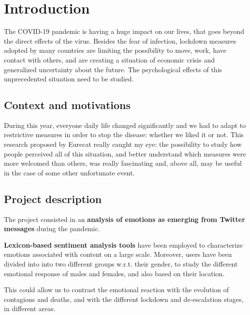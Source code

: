 \chapter{Introduction}
\label{cha:intro}

The COVID-19 pandemic is having a huge impact on our lives, that goes beyond the direct effects of the virus. Besides the fear of infection, lockdown measures adopted by many countries are limiting the possibility to move, work, have contact with others, and are creating a situation of economic crisis and generalized uncertainty about the future. The psychological effects of this unprecedented situation need to be studied.


\section{Context and motivations}
\label{sec:context}

During this year, everyone daily life changed significantly and we had to adapt to restrictive measures in order to stop the disease: whether we liked it or not. This research proposed by Eurecat really caught my eye: the possibility to study how people perceived all of this situation, and better understand which measures were more welcomed than others, was really fascinating and, above all, may be useful in the case of some other unfortunate event.

\section{Project description}
\label{sec:project}

The project consisted in an \textbf{analysis of emotions as emerging from Twitter messages} during the pandemic.

\textbf{Lexicon-based sentiment analysis tools} have been employed to characterize emotions associated with content on a large scale. Moreover, users have been divided into into two different groups w.r.t. their gender, to study the different emotional response of males and females, and also based on their location. 

This could allow us to contrast the emotional reaction with the evolution of contagions and deaths, and with the different lockdown and de-escalation stages, in different areas.


